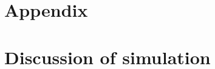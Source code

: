 \documentclass[12pt,a4paper]{article}
\begin{document}

\printbibliography





\begin{appendices}

\newpage
\section*{Appendix}
\section{Discussion of simulation}\label{appendixA}


\end{appendices}
\end{document}

